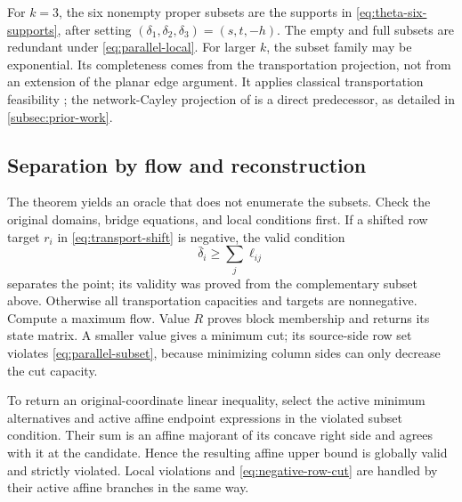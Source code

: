 For $k=3$, the six nonempty proper subsets are the supports in
\eqref{eq:theta-six-supports}, after setting
$(\delta_1,\delta_2,\delta_3)=(s,t,-h)$. The empty and full subsets
are redundant under \eqref{eq:parallel-local}. For larger $k$, the
subset family may be exponential. Its completeness comes from the
transportation projection, not from an extension of the planar edge
argument. It applies classical transportation feasibility
\citep{FordFulkerson1956Transportation}; the network-Cayley projection of
\citet[Sections~5.7 and~5.9]{KisHorvath2022} is a direct predecessor, as
detailed in \cref{subsec:prior-work}.

\subsection{Separation by flow and reconstruction}\label{subsec:parallel-oracle}
The theorem yields an oracle that does not enumerate the subsets. Check
the original domains, bridge equations, and local conditions first.
If a shifted row target $r_i$ in \eqref{eq:transport-shift} is negative,
the valid condition
\begin{equation}\label{eq:negative-row-cut}
 \bar\delta_i\ge\sum_j\ell_{ij}
\end{equation}
separates the point; its validity was proved from the complementary
subset above. Otherwise all transportation capacities and targets are
nonnegative. Compute a maximum flow. Value $R$ proves block membership
and returns its state matrix. A smaller value gives a minimum cut;
its source-side row set violates \eqref{eq:parallel-subset}, because
minimizing column sides can only decrease the cut capacity.

To return an original-coordinate linear inequality, select the active
minimum alternatives and active affine endpoint expressions in the
violated subset condition. Their sum is an affine majorant of its
concave right side and agrees with it at the candidate. Hence the
resulting affine upper bound is globally valid and strictly violated.
Local violations and \eqref{eq:negative-row-cut} are handled by their
active affine branches in the same way.


